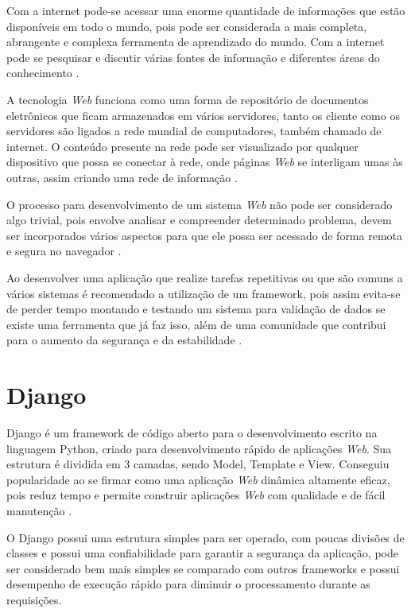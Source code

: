 \documentclass{ifto-tex}
\begin{document}
Com a internet pode-se acessar uma enorme quantidade de informações que estão disponíveis em todo o mundo, pois pode ser considerada a mais completa, abrangente e complexa ferramenta de aprendizado do mundo. Com a internet pode se pesquisar e discutir várias fontes de informação e diferentes áreas do conhecimento \cite{garcia2002internet}.

A tecnologia \textit{Web} funciona como uma forma de repositório de documentos eletrônicos que ficam armazenados em vários servidores, tanto os cliente como os servidores são ligados a rede mundial de computadores, também chamado de internet. O conteúdo presente na rede pode ser visualizado por qualquer dispositivo que possa se conectar à rede, onde páginas \textit{Web} se interligam umas às outras, assim criando uma rede de informação \cite{junior2009sistemas}.

O processo para desenvolvimento de um sistema \textit{Web} não pode ser considerado algo trivial, pois envolve analisar e compreender determinado problema, devem ser incorporados vários aspectos para que ele possa ser acessado de forma remota e segura no navegador \cite{miletto2014desenvolvimento}.

Ao desenvolver uma aplicação que realize tarefas repetitivas ou que são comuns a vários sistemas é recomendado a utilização de um framework, pois assim evita-se de perder tempo montando e testando um sistema para validação de dados se existe uma ferramenta que já faz isso, além de uma comunidade que contribui para o aumento da segurança e da estabilidade \cite{OqueeumF24:online}.


\section{Django}
Django é um framework de código aberto para o desenvolvimento escrito na linguagem Python, criado para desenvolvimento rápido de aplicações \textit{Web}.  Sua estrutura é dividida em 3 camadas, sendo Model, Template e View. Conseguiu popularidade ao se firmar como uma aplicação \textit{Web} dinâmica altamente eficaz, pois reduz tempo e permite construir aplicações \textit{Web} com qualidade e de fácil manutenção \cite{badindesenvolvimento}.

O Django possui uma estrutura simples para ser operado, com poucas divisões de classes e possui uma confiabilidade para garantir a segurança da aplicação, pode ser considerado bem mais simples se comparado com outros frameworks e possui desempenho de execução rápido para diminuir o processamento durante as requisições.
\end{document}
